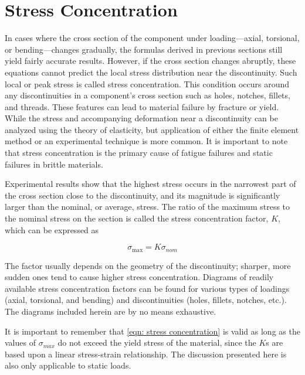 \documentclass[
10pt,
a4paper,
openany,
svgnames,
]{book}
\begin{document}
\section{Stress Concentration}

In cases where the cross section of the component under loading—axial, torsional, or bending—changes gradually, the formulas derived in previous sections still yield fairly accurate results. However, if the cross section changes abruptly, these equations cannot predict the local stress distribution near the discontinuity. Such local or peak stress is called stress concentration. This condition occurs around any discontinuities in a component’s cross section such as holes, notches, fillets, and threads. These features can lead to material failure by fracture or yield. While the stress and accompanying deformation near a discontinuity can be analyzed using the theory of elasticity, but application of either the finite element method or an experimental technique is more common. It is important to note that stress concentration is the primary cause of fatigue failures and static failures in brittle materials.

Experimental results show that the highest stress occurs in the narrowest part of the cross section close to the discontinuity, and its magnitude is significantly larger than the nominal, or average, stress. The ratio of the maximum stress to the nominal stress on the section is called the stress concentration factor, $K$, which can be expressed as

\begin{equation} \label{eqn: stress concentration}
  \sigma _{\max } = K\sigma _{nom}
\end{equation}

The factor usually depends on the geometry of the discontinuity; sharper, more sudden ones tend to cause higher stress concentration. Diagrams of readily available stress concentration factors can be found for various types of loadings (axial, torsional, and bending) and discontinuities (holes, fillets, notches, etc.). The diagrams included herein are by no means exhaustive.

It is important to remember that \cref{eqn: stress concentration} is valid as long as the values of $\sigma_{max}$ do not exceed the yield stress of the material, since the $K$s are based upon a linear stress-strain relationship. The discussion presented here is also only applicable to static loads.
\end{document}
